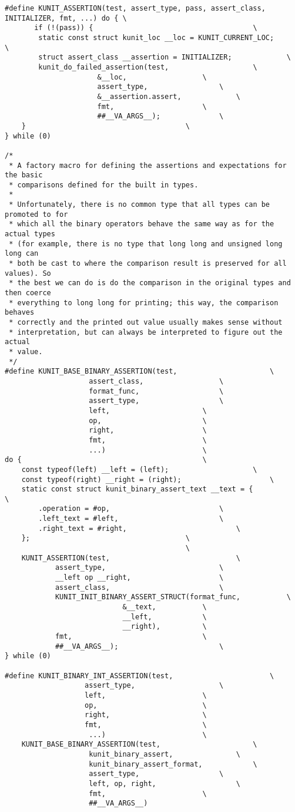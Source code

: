 \documentclass{article}
\begin{document}
\begin{lstlisting}[style=CStyle]
#define KUNIT_ASSERTION(test, assert_type, pass, assert_class, INITIALIZER, fmt, ...) do { \
       if (!(pass)) {	  					               \
		static const struct kunit_loc __loc = KUNIT_CURRENT_LOC;       \
		struct assert_class __assertion = INITIALIZER;		       \
		kunit_do_failed_assertion(test,				       \
					  &__loc,			       \
					  assert_type,			       \
					  &__assertion.assert,		       \
					  fmt,				       \
					  ##__VA_ARGS__);		       \
	}								       \
} while (0)

/*
 * A factory macro for defining the assertions and expectations for the basic
 * comparisons defined for the built in types.
 *
 * Unfortunately, there is no common type that all types can be promoted to for
 * which all the binary operators behave the same way as for the actual types
 * (for example, there is no type that long long and unsigned long long can
 * both be cast to where the comparison result is preserved for all values). So
 * the best we can do is do the comparison in the original types and then coerce
 * everything to long long for printing; this way, the comparison behaves
 * correctly and the printed out value usually makes sense without
 * interpretation, but can always be interpreted to figure out the actual
 * value.
 */
#define KUNIT_BASE_BINARY_ASSERTION(test,				       \
				    assert_class,			       \
				    format_func,			       \
				    assert_type,			       \
				    left,				       \
				    op,					       \
				    right,				       \
				    fmt,				       \
				    ...)				       \
do {									       \
	const typeof(left) __left = (left);				       \
	const typeof(right) __right = (right);				       \
	static const struct kunit_binary_assert_text __text = {		       \
		.operation = #op,					       \
		.left_text = #left,					       \
		.right_text = #right,					       \
	};								       \
									       \
	KUNIT_ASSERTION(test,						       \
			assert_type,					       \
			__left op __right,				       \
			assert_class,					       \
			KUNIT_INIT_BINARY_ASSERT_STRUCT(format_func,	       \
							&__text,	       \
							__left,		       \
							__right),	       \
			fmt,						       \
			##__VA_ARGS__);					       \
} while (0)

#define KUNIT_BINARY_INT_ASSERTION(test,				       \
				   assert_type,				       \
				   left,				       \
				   op,					       \
				   right,				       \
				   fmt,					       \
				    ...)				       \
	KUNIT_BASE_BINARY_ASSERTION(test,				       \
				    kunit_binary_assert,		       \
				    kunit_binary_assert_format,		       \
				    assert_type,			       \
				    left, op, right,			       \
				    fmt,				       \
				    ##__VA_ARGS__)


\end{lstlisting}
\end{document}
